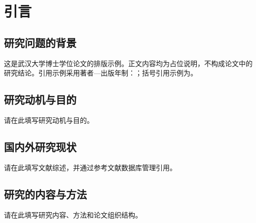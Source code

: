 \chapter{引言}
\section{研究问题的背景}
这是武汉大学博士学位论文的排版示例。正文内容均为占位说明，不构成论文中的研究结论。引用示例采用著者—出版年制：\citet{lamport1994}；括号引用示例为\citep{knuth1984}。
\section{研究动机与目的}
请在此填写研究动机与目的。
\section{国内外研究现状}
请在此填写文献综述，并通过参考文献数据库管理引用。
\section{研究的内容与方法}
请在此填写研究内容、方法和论文组织结构。
